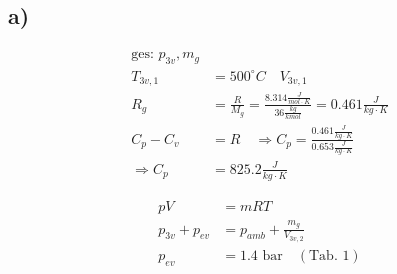 

\subsection*{a)}
\begin{align*}
\text{ges: } p_{3v}, m_g \\
T_{3v,1} &= 500^\circ C \quad V_{3v,1} \\
R_g &= \frac{R}{M_g} = \frac{8.314 \frac{J}{mol \cdot K}}{36 \frac{kg}{kmol}} = 0.461 \frac{J}{kg \cdot K} \\
C_p - C_v &= R \quad \Rightarrow C_p = \frac{0.461 \frac{J}{kg \cdot K}}{0.653 \frac{J}{kg \cdot K}} \\
\Rightarrow C_p &= 825.2 \frac{J}{kg \cdot K}
\end{align*}

\begin{align*}
pV &= mRT \\
p_{3v} + p_{ev} &= p_{amb} + \frac{m_g}{V_{3v,2}} \\
p_{ev} &= 1.4 \text{ bar} \quad (\text{Tab. 1})
\end{align*}